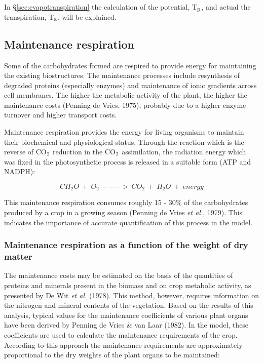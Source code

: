 In \S \ref{sec:evapotranspiration} the calculation of the potential, T$_{{\rm p}}$, and actual 
the transpiration, T$_{{\rm a}}$, will be explained.

\subsection{Maintenance respiration}

Some of the carbohydrates formed are respired to provide energy for maintaining the
existing biostructures. The maintenance processes include resynthesis of degraded proteins
(especially enzymes) and maintenance of ionic gradients across cell membranes. The
higher the metabolic activity of the plant, the higher the maintenance costs (Penning de
Vries, 1975), probably due to a higher enzyme turnover and higher transport costs.

Maintenance respiration provides the energy for living organisms to maintain their
biochemical and physiological status. Through the reaction which is the reverse of CO$_{{\rm 2}}$
reduction in the CO$_{{\rm 2}}$ assimilation, the radiation energy which was fixed in the
photosynthetic process is released in a suitable form (ATP and NADPH):

\begin{equation}
CH _{2} O ~+~ O _{2} ~--->~ CO _{2} ~+~ H _{2} O ~+~ energy
\end{equation}

This maintenance respiration consumes roughly 15 - 30\% of the carbohydrates produced
by a crop in a growing season (Penning de Vries {\it et al.}, 1979). This indicates the
importance of accurate quantification of this process in the model.

\subsubsection{Maintenance respiration as a function of the weight of dry matter}
The maintenance costs may be estimated on the basis of the quantities of proteins and
minerals present in the biomass and on crop metabolic activity, as presented by De Wit {\it et
al.} (1978). This method, however, requires information on the nitrogen and mineral
contents of the vegetation.
Based on the results of this analysis, typical values for the maintenance coefficients of
various plant organs have been derived by Penning de Vries \& van Laar (1982).
In the model, these coefficients are used to calculate the maintenance requirements of the
crop. According to this approach the maintenance requirements are approximately 
proportional to the dry weights of the plant organs to be maintained: 

